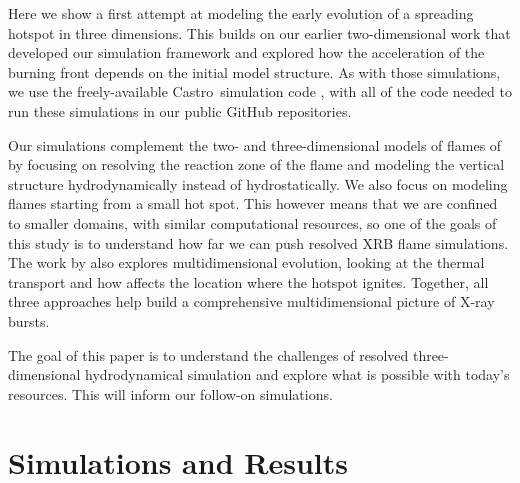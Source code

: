 \documentclass[linenumbers,trackchanges]{aastex631}
\newcommand{\castro}{{\sf Castro}}
\begin{document}
Here we show a first attempt at modeling the early evolution of a spreading
hotspot in three dimensions.  This builds on our earlier two-dimensional
work \citep{eiden:2020,harpole:2021} that developed our
simulation framework and explored how the acceleration of the burning
front depends on the initial model structure.  As with those
simulations, we use the freely-available \castro\ simulation code
\citep{castro,castro_joss}, with all of the code needed to run these
simulations in our public GitHub repositories.

Our simulations complement the two- and three-dimensional models of flames of
\citet{cavecchi:2013,art-2015-cavecchi-etal,art-2016-cavecchi-etal,Cavecchi2019}
by focusing on resolving the reaction zone of the flame and modeling
the vertical structure hydrodynamically instead of hydrostatically.
We also focus on modeling flames starting from a small hot spot.  This
however means that we are confined to smaller domains, with similar
computational resources, so one of the goals of this study is to
understand how far we can push resolved XRB flame simulations.  The
work by \citet{goodwin:2021} also explores multidimensional evolution,
looking at the thermal transport and how  affects the location where
the hotspot ignites.  Together, all three approaches help build a
comprehensive multidimensional picture of X-ray bursts.

The goal of this paper is to understand the challenges of resolved
three-dimensional hydrodynamical simulation and explore what is
possible with today's resources.  This will inform our follow-on
simulations.

\section{Simulations and Results}\label{Sec:results}
\end{document}
